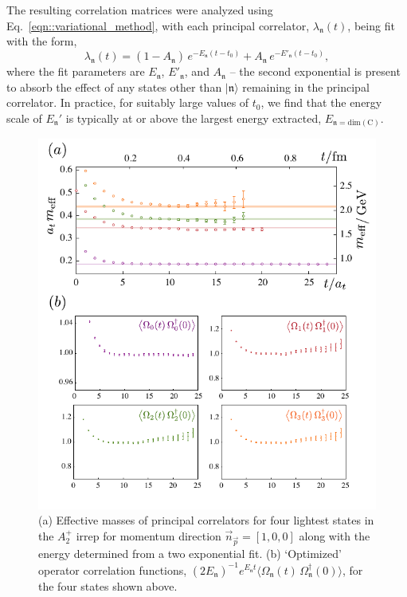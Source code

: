 \documentclass[twocolumn,amsmath,amssymb,prd,10pt,floatfix, 
superscriptaddress,nofootinbib, showpacs, preprintnumbers]{revtex4-1}
\begin{document}
The resulting correlation matrices were analyzed using Eq.~\ref{eqn::variational_method}, with each principal correlator, $\lambda_\mathfrak{n}(t)$, being fit with the form,
\begin{equation}
\lambda_\mathfrak{n}(t) = (1- A_\mathfrak{n})\, e^{- E_\mathfrak{n} (t-t_0) } + A_\mathfrak{n}\, e^{- E'_\mathfrak{n} (t-t_0) },
\end{equation}
where the fit parameters are $E_\mathfrak{n}$, $E'_\mathfrak{n}$, and $A_\mathfrak{n}$ -- the second exponential is present to absorb the effect of any states other than $|\mathfrak{n}\rangle$ remaining in the principal correlator. In practice, for suitably large values of $t_0$, we find that the energy scale of $E_\mathfrak{n}'$ is typically at or above the largest energy extracted, $E_{\mathfrak{n} = \mathrm{dim(C)}}$.


\begin{figure}
\includegraphics[width=\linewidth]{fig2.pdf}
\caption{
(a) Effective masses of principal correlators for four lightest states in the $A_2^+$ irrep for momentum direction $\vec{n}_{\vec{p}} = [1,0,0]$ along with the energy determined from a two exponential fit. (b) `Optimized' operator correlation functions, $(2E_\mathfrak{n})^{-1} e^{E_\mathfrak{n}t} \big\langle \Omega_\mathfrak{n}(t) \, \Omega_\mathfrak{n}^\dag(0) \big\rangle$, for the four states shown above.
\label{fig::SpecD4A2M}}
\end{figure}
\end{document}
